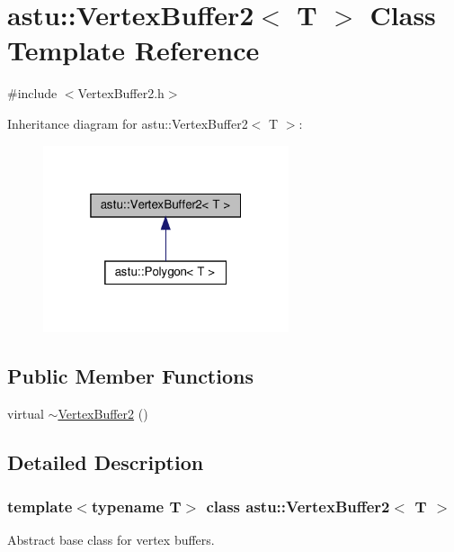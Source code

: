 \hypertarget{classastu_1_1VertexBuffer2}{}\section{astu\+:\+:Vertex\+Buffer2$<$ T $>$ Class Template Reference}
\label{classastu_1_1VertexBuffer2}


{\ttfamily \#include $<$Vertex\+Buffer2.\+h$>$}



Inheritance diagram for astu\+:\+:Vertex\+Buffer2$<$ T $>$\+:\nopagebreak
\begin{figure}[H]
\begin{center}
\leavevmode
\includegraphics[width=205pt]{classastu_1_1VertexBuffer2__inherit__graph}
\end{center}
\end{figure}
\subsection*{Public Member Functions}
\begin{DoxyCompactItemize}
\item 
virtual \hyperlink{classastu_1_1VertexBuffer2_a2b9e9497a9604c9e160047f8f8ae7d0d}{$\sim$\+Vertex\+Buffer2} ()
\end{DoxyCompactItemize}


\subsection{Detailed Description}
\subsubsection*{template$<$typename T$>$\newline
class astu\+::\+Vertex\+Buffer2$<$ T $>$}

Abstract base class for vertex buffers.


